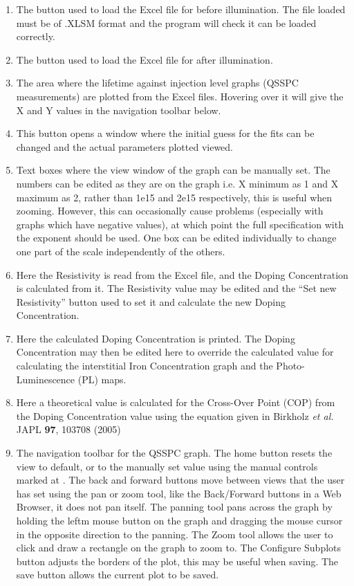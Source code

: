 \documentclass[final,a4paper,oneside,12pt]{article}
\begin{document}
\begin{enumerate}
\item The button used to load the Excel file for before illumination. The file loaded must be of .XLSM format and the program will check it can be loaded correctly.

\item The button used to load the Excel file for after illumination.

\item The area where the lifetime against injection level graphs (QSSPC measurements) are plotted from the Excel files. Hovering over it will give the X and Y values in the navigation toolbar below.

\item This button opens a window where the initial guess for the fits can be changed and the actual parameters plotted viewed.

\item Text boxes where the view window of the graph can be manually set. The numbers can be edited as they are on the graph i.e. X minimum as 1 and X maximum as 2, rather than 1e15 and 2e15 respectively, this is useful when zooming. However, this can occasionally cause problems (especially with graphs which have negative values), at which point the full specification with the exponent should be used. One box can be edited individually to change one part of the scale independently of the others.

\item  Here the Resistivity is read from the Excel file, and the Doping Concentration is calculated from it. The Resistivity value may be edited and the ``Set new Resistivity'' button used to set it and calculate the new Doping Concentration.

\item Here the calculated Doping Concentration is printed. The Doping Concentration may then be edited here to override the calculated value for calculating the interstitial Iron Concentration graph and the Photo-Luminescence (PL) maps.

\item Here a theoretical value is calculated for the Cross-Over Point (COP) from the Doping Concentration value using the equation given in Birkholz \textit{et al.} JAPL {\bf 97}, 103708 (2005)

\item The navigation toolbar for the QSSPC graph. The home button resets the view to default, or to the manually set value using the manual controls marked at {\color{red}{\bf 5}}. The back and forward buttons move between views that the user has set using the pan or zoom tool, like the Back/Forward buttons in a Web Browser, it does not pan itself. The panning tool pans across the graph by holding the leftm mouse button on the graph and dragging the mouse cursor in the opposite direction to the panning. The Zoom tool allows the user to click and draw a rectangle on the graph to zoom to. The Configure Subplots button adjusts the borders of the plot, this may be useful when saving. The save button allows the current plot to be saved.


\end{enumerate}
\end{document}
